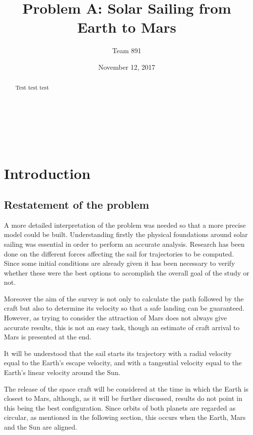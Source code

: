 \documentclass[twocolumn,12pt,a4paper]{article}
\author{\textsf{Team 891}}
\title{\textsf{\textbf{Problem A: Solar Sailing from Earth to Mars}}}
\date{\textsf{November 12, 2017}}
\numberwithin{equation}{section}
\begin{document}
\renewcommand{\abstractname}{}
\renewcommand{\absnamepos}{empty}
\begin{titlingpage}
 \maketitle

\noindent \hrulefill \\
\begin{abstract}
Test test test

\end{abstract}
\hrulefill \\

\end{titlingpage}

\clearpage

\section{Introduction}
\subsection{Restatement of the problem}

 A more detailed interpretation of the problem was needed so that a more precise model could be built. Understanding firstly the physical foundations around solar sailing was essential in order to perform an accurate analysis. Research has been done on the different forces affecting the sail for trajectories to be computed. Since some initial conditions are already given it has been necessary to verify whether these were the best options to accomplish the overall goal of the study or not.
 
  Moreover the aim of the survey is not only to calculate the path followed by the craft but also to determine its velocity so that a safe landing can be guaranteed. However, as trying to consider the attraction of Mars does not always give accurate results, this is not an easy task, though an estimate of craft arrival to Mars is presented at the end.
 
 It will be understood that the sail starts its trajectory with a radial velocity equal to the Earth's escape velocity, and with a tangential velocity equal to the Earth's linear velocity around the Sun. 
 
The release of the space craft will be considered at the time in which the Earth is closest to Mars, although, as it will be further discussed, results do not point in this being the best configuration. Since orbits of both planets are regarded as circular, as mentioned in the following section, this occurs when the Earth, Mars and the Sun are aligned.
\end{document}
